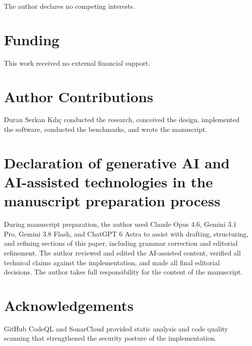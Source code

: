 \documentclass[a4paper,fleqn]{cas-sc}
\begin{document}
The author declares no competing interests.

\section*{Funding}\label{funding}

This work received no external financial support.

\section*{Author Contributions}\label{author-contributions}

Duran Serkan Kılıç conducted the research, conceived the design,
implemented the software, conducted the benchmarks, and wrote the
manuscript.

\section*{Declaration of generative AI and AI-assisted technologies in
the manuscript preparation
process}\label{declaration-of-generative-ai-and-ai-assisted-technologies-in-the-manuscript-preparation-process}

During manuscript preparation, the author used Claude Opus 4.6, Gemini
3.1 Pro, Gemini 3.8 Flash, and ChatGPT 6 Astra to assist with drafting,
structuring, and refining sections of this paper, including grammar
correction and editorial refinement. The author reviewed and edited the
AI-assisted content, verified all technical claims against the
implementation, and made all final editorial decisions. The author takes
full responsibility for the content of the manuscript.

\section*{Acknowledgements}\label{acknowledgements}

GitHub CodeQL and SonarCloud provided static analysis and code quality
scanning that strengthened the security posture of the implementation.

\newpage



\end{document}
